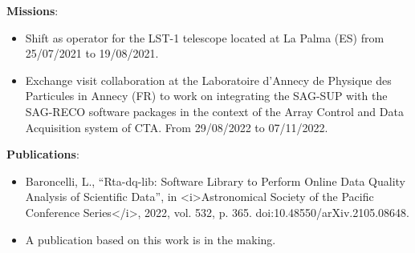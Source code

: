 \textbf{Missions}:
\begin{itemize}
    \item Shift as operator for the LST-1 telescope located at La Palma (ES) from 25/07/2021 to 19/08/2021.
    \item Exchange visit collaboration at the Laboratoire d'Annecy de Physique des Particules in Annecy (FR) to work on integrating the SAG-SUP with the SAG-RECO software packages in the context of the Array Control and Data Acquisition system of CTA. From 29/08/2022 to 07/11/2022.
\end{itemize}

\textbf{Publications}:
\begin{itemize}
    \item Baroncelli, L., “Rta-dq-lib: Software Library to Perform Online Data Quality Analysis of Scientific Data”, in <i>Astronomical Society of the Pacific Conference Series</i>, 2022, vol. 532, p. 365. doi:10.48550/arXiv.2105.08648.
    \item A publication based on this work is in the making. 
\end{itemize}

